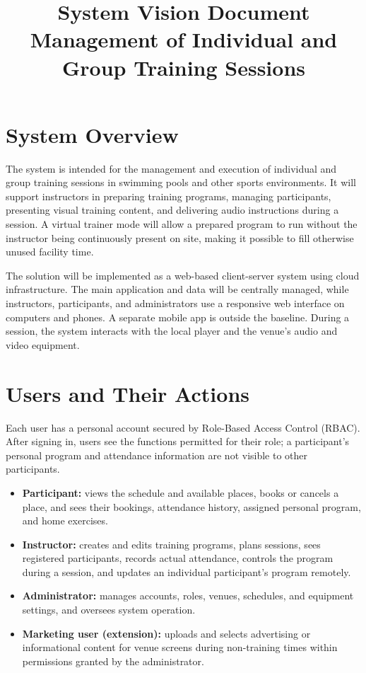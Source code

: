 \documentclass[a4paper,11pt]{article}
\title{System Vision Document\\\large Management of Individual and Group Training Sessions}
\begin{document}
\maketitle

\section{System Overview}

The system is intended for the management and execution of individual and group training sessions in swimming pools and other sports environments. It will support instructors in preparing training programs, managing participants, presenting visual training content, and delivering audio instructions during a session. A virtual trainer mode will allow a prepared program to run without the instructor being continuously present on site, making it possible to fill otherwise unused facility time.

The solution will be implemented as a web-based client-server system using cloud infrastructure. The main application and data will be centrally managed, while instructors, participants, and administrators use a responsive web interface on computers and phones. A separate mobile app is outside the baseline. During a session, the system interacts with the local player and the venue's audio and video equipment.

\section{Users and Their Actions}

Each user has a personal account secured by Role-Based Access Control (RBAC). After signing in, users see the functions permitted for their role; a participant's personal program and attendance information are not visible to other participants.

\begin{itemize}
    \item \textbf{Participant:} views the schedule and available places, books or cancels a place, and sees their bookings, attendance history, assigned personal program, and home exercises.
    \item \textbf{Instructor:} creates and edits training programs, plans sessions, sees registered participants, records actual attendance, controls the program during a session, and updates an individual participant's program remotely.
    \item \textbf{Administrator:} manages accounts, roles, venues, schedules, and equipment settings, and oversees system operation.
    \item \textbf{Marketing user (extension):} uploads and selects advertising or informational content for venue screens during non-training times within permissions granted by the administrator.
\end{itemize}
\end{document}
